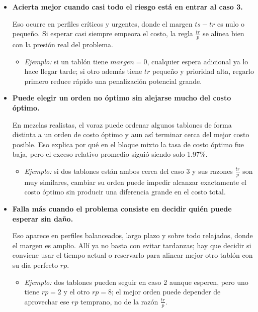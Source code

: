 \documentclass[12pt,a4paper]{article}
\begin{document}
\begin{itemize}
  \setlength{\itemsep}{0.7em}
  \item \textbf{Acierta mejor cuando casi todo el riesgo est\'a en entrar al caso 3.}

  Eso ocurre en perfiles cr\'iticos y urgentes, donde el margen \(ts-tr\) es nulo o peque\~no. Si esperar casi siempre empeora el costo, la regla \(\frac{tr}{p}\) se alinea bien con la presi\'on real del problema.

  \begin{itemize}
    \setlength{\itemsep}{0.2em}
    \item \textit{Ejemplo:} si un tabl\'on tiene \(margen=0\), cualquier espera adicional ya lo hace llegar tarde; si otro adem\'as tiene \(tr\) peque\~no y prioridad alta, regarlo primero reduce r\'apido una penalizaci\'on potencial grande.
  \end{itemize}

  \item \textbf{Puede elegir un orden no \'optimo sin alejarse mucho del costo \'optimo.}

  En mezclas realistas, el voraz puede ordenar algunos tablones de forma distinta a un orden de costo \'optimo y aun as\'i terminar cerca del mejor costo posible. Eso explica por qu\'e en el bloque mixto la tasa de costo \'optimo fue baja, pero el exceso relativo promedio sigui\'o siendo solo 1.97\%.

  \begin{itemize}
    \setlength{\itemsep}{0.2em}
    \item \textit{Ejemplo:} si dos tablones est\'an ambos cerca del caso 3 y sus razones \(\frac{tr}{p}\) son muy similares, cambiar su orden puede impedir alcanzar exactamente el costo \'optimo sin producir una diferencia grande en el costo total.
  \end{itemize}

  \item \textbf{Falla m\'as cuando el problema consiste en decidir qui\'en puede esperar sin da\~no.}

  Eso aparece en perfiles balanceados, largo plazo y sobre todo relajados, donde el margen es amplio. All\'i ya no basta con evitar tardanzas; hay que decidir si conviene usar el tiempo actual o reservarlo para alinear mejor otro tabl\'on con su d\'ia perfecto \(rp\).

  \begin{itemize}
    \setlength{\itemsep}{0.2em}
    \item \textit{Ejemplo:} dos tablones pueden seguir en caso 2 aunque esperen, pero uno tiene \(rp=2\) y el otro \(rp=8\); el mejor orden puede depender de aprovechar ese \(rp\) temprano, no de la raz\'on \(\frac{tr}{p}\).
  \end{itemize}


\end{itemize}
\end{document}
